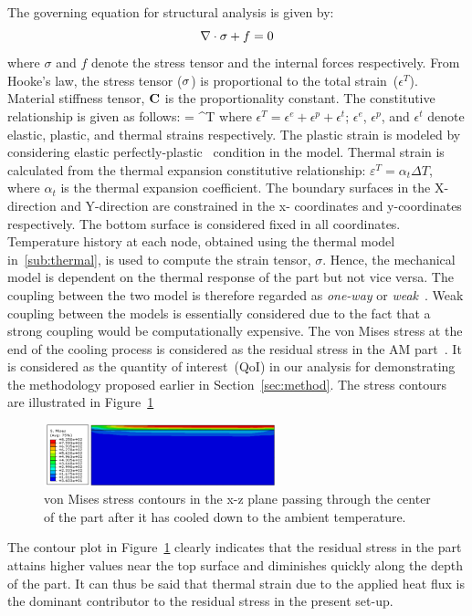 The governing equation for structural analysis \cite{Megahed:2016} is given by:
%
\begin{equation}\label{eq_mechanical}
\nabla \cdot \mathbf{{\sigma}}+f = 0
\end{equation}
%
where $\sigma$ and $f$ denote the stress tensor and the internal forces respectively. From Hooke's law, the stress
tensor ($\mathbf{{\sigma}}$) is proportional to the total strain~($\epsilon^T$). Material stiffness tensor, $\mathbf{{C}}$ is the
proportionality constant. The constitutive relationship is given as follows:
%
\be
\mat{\sigma} = \epsilon^T
\ee
%
where $\epsilon^T = \epsilon^e + \epsilon^p+ \epsilon^t$; $\epsilon^e$, $\epsilon^p$, and $\epsilon^t$ denote elastic, 
plastic, and thermal strains respectively. The plastic strain is modeled by considering elastic 
perfectly-plastic~\cite{Zhao:2015} condition in the model. Thermal strain is calculated  from the thermal expansion 
constitutive relationship: $\varepsilon^T = \alpha_{t}\Delta T$, where $\alpha_t $ is the thermal expansion coefficient.
The boundary surfaces in the X-direction and Y-direction are constrained in the x-
coordinates and y-coordinates respectively. The bottom surface is considered fixed in all coordinates.
Temperature history at each node, obtained using the thermal model in~\ref{sub:thermal}, is used to
compute the strain tensor, $\sigma$. Hence, the mechanical model is dependent on the thermal response
of the part but not vice versa. The coupling between the two model is therefore regarded as \textit{one-way}
or \textit{weak}~\cite{Debroy:2017}. Weak coupling between the models is essentially considered due to the fact
that a strong coupling would be computationally expensive. The von Mises stress at the end of the cooling process
is considered as the residual stress in the AM part~\cite{Vastola:2016}. 
It is considered as the quantity of interest~(QoI) in our analysis for 
demonstrating the methodology proposed earlier in Section~\ref{sec:method}. The stress contours are illustrated
in Figure~\ref{fig:subSmises} 
%
\begin{figure}[htbp]
\begin{center}
\includegraphics[width=0.6\textwidth]{./Figures/SMisesNom} 
\end{center}
\caption{von Mises stress contours in the x-z plane passing through the center of the part after it has cooled
down to the ambient temperature.}
\label{fig:subSmises}
\end{figure}
%
The contour plot in Figure~\ref{fig:subSmises} clearly indicates that the residual stress in the part attains higher
values near the top surface and diminishes quickly along the depth of the part. It can thus be said that thermal
strain due to the applied heat flux is the dominant contributor to the residual stress in the present set-up. 

